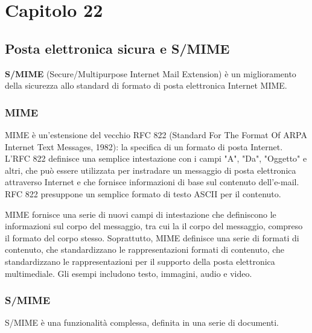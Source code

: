\chapter{Capitolo 22}
\section{Posta elettronica sicura e S/MIME}
\textbf{S/MIME} (Secure/Multipurpose Internet Mail Extension) è un miglioramento della sicurezza allo standard di formato di posta elettronica Internet MIME.
\subsection{MIME}
MIME è un'estensione del vecchio RFC 822 (Standard For The Format Of ARPA Internet Text Messages, 1982): la specifica di un formato di posta Internet. L'RFC 822 definisce una semplice intestazione con i campi "A", "Da", "Oggetto" e altri, che può essere utilizzata per instradare un messaggio di posta elettronica attraverso Internet e che fornisce informazioni di base sul contenuto dell'e-mail. RFC 822 presuppone un semplice formato di testo ASCII per il contenuto. 

\singlespacing

MIME fornisce una serie di nuovi campi di intestazione che definiscono le informazioni sul corpo del messaggio, tra cui la il corpo del messaggio, compreso il formato del corpo stesso. Soprattutto, MIME definisce una serie di formati di contenuto, che standardizzano le rappresentazioni formati di contenuto, che standardizzano le rappresentazioni per il supporto della posta elettronica multimediale. Gli esempi includono testo, immagini, audio e video.

\subsection{S/MIME}
S/MIME è una funzionalità complessa, definita in una serie di documenti. 

\singlespacing

